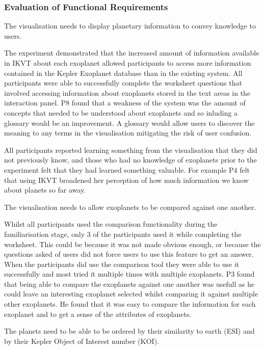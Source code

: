 \subsubsection{Evaluation of Functional Requirements}
\begin{enumerate}
{\bf
 \item[R1.] The visualisation needs to display planetary information to convey
knowledge to users.}

The experiment demonstrated that the increased amount of information available in IKVT
 about each exoplanet allowed participants to access
more information contained in the Kepler Exoplanet database than in the existing
system. All participants were able to successfully complete the worksheet
questions
that involved accessing information about exoplanets stored in the
text areas in the interaction panel.
P8 found that a weakness of the system was the amount of concepts that needed
to be understood about exoplanets and so inluding a glossary would be an
improvement. A glossary would allow users to discover the meaning to any terms in the visualisation mitigating the risk of user
confusion.

All participants reported learning something from the visualisation that they
did not previously know, and those who had no knowledge of exoplanets prior to
the experiment felt that they had learned something valuable. For example P4
felt that using IKVT broadened her perception of how much information we know
about planets so far away.


{\bf
 \item[R2.] The visualisation needs to allow exoplanets to be compared against
one another.}

Whilst all participants used the comparison functionality during the
familiarisation stage, only 3 of the participants used it while completing the
worksheet. This could be because it was not made obvious enough, or because the
questions asked of users did not force users to use this feature to get an
answer. When the participants did use the comparison tool they were able to use
it successfully and most tried it multiple times with multiple exoplanets. P3
found that being able to compare the exoplanets against one another was usefull
as he could leave an interesting exoplanet selected whilst comparing it against
multiple other exoplanets. He found that it was easy to compare the information
for each exoplanet and to get a sense of the attributes of exoplanets.

{\bf
 \item[R3.] The planets need to be able to be ordered by their similarity to
earth (ESI) and by their Kepler Object of Interest number (KOI).}
 

\end{enumerate}
